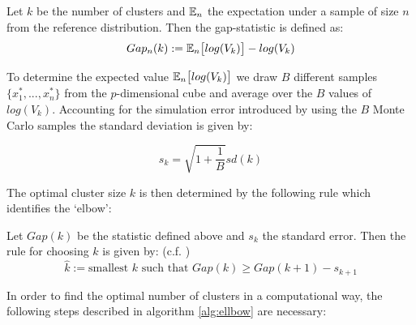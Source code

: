 \begin{definition}
Let $k$ be the number of clusters and $\mathbb{E}_n$ the expectation under a sample of size $n$ from
the reference distribution. Then the gap-statistic is defined as: 
	\begin{equation}\label{equ:gap_statistic}
		Gap_n(k) := \mathbb{E}_n\big[log(V_k) \big] - log(V_k)
	\end{equation}
\end{definition}

To determine the expected value $\mathbb{E}_n\big[log(V_k) \big]$ we draw $B$ different samples $\{x_1^*, ..., x_n^*\}$ from the $p$-dimensional cube and average over the $B$ values of $log(V_k)$. Accounting for the simulation error introduced by using the $B$ Monte Carlo samples the standard deviation is given by: 

\begin{equation*}
	s_k = \sqrt{1 + \frac{1}{B}} sd(k)
\end{equation*}

The optimal cluster size $k$ is then determined by the following rule which identifies the `elbow':

\begin{definition} Let $Gap(k)$ be the statistic defined above and $s_k$ the standard error. Then the rule for choosing $k$ is given by: (c.f. \cite{tibshirani2001estimating}) 
	\begin{equation}\label{equ:gap_statistic_rule}
	\hat{k} := \text{smallest } k \text{ such that } Gap(k) \geq Gap(k+1) - s_{k+1}
	\end{equation}
\end{definition}

In order to find the optimal number of clusters in a computational way, the following steps described in algorithm \ref{alg:ellbow} are necessary:

